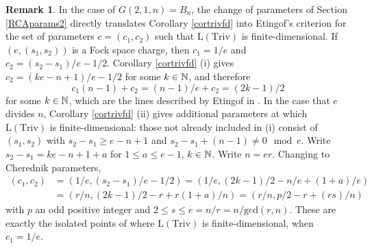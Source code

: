 \documentclass[12pt]{amsart}
\numberwithin{equation}{section}
\theoremstyle{definition}
\newtheorem{remark}[equation]{Remark}
\newcommand{\el}{\mathrm{L}}
\newcommand{\triv}{\mathrm{Triv}}
\begin{document}
\begin{remark}
In the case of $G(2,1,n)=B_n$, the change of parameters of Section \ref{RCAparams2} directly translates Corollary \ref{cortrivfd} into Etingof's criterion \cite[Section 4.2]{Etingof2012} for the set of parameters $c=(c_1,c_2)$ such that $\el(\triv)$ is finite-dimensional. If $(e,(s_1,s_2))$ is a Fock space charge, then $c_1=1/e$ and $c_2=(s_2-s_1)/e-1/2$. Corollary \ref{cortrivfd} (i) gives $c_2=(ke-n+1)/e-1/2$ for some $k\in\mathbb{N}$, and therefore $$c_1(n-1)+c_2=(n-1)/e+c_2=(2k-1)/2$$ for some $k\in\mathbb{N}$, which are the lines described by Etingof in \cite[Section 4.2]{Etingof2012}. In the case that $e$ divides $n$, Corollary \ref{cortrivfd} (ii) gives additional parameters at which $\el(\triv)$ is finite-dimensional: those not already included in (i) consist of $(s_1,s_2)$ with $s_2-s_1\geq e-n+1$ and $s_2-s_1+(n-1)\neq 0 \mod e$. Write $s_2-s_1=ke-n+1+a$ for $1\leq a\leq e-1$, $k\in\mathbb{N}$. Write $n=er$. Changing to Cherednik parameters, 
\begin{align*}(c_1,c_2)&=(1/e,(s_2-s_1)/e-1/2)=(1/e,(2k-1)/2-n/e+(1+a)/e)\\&=(r/n,(2k-1)/2-r+r(1+a)/n)=(r/n,p/2-r+(rs)/n)
\end{align*}
with $p$ an odd positive integer and $2\leq s\leq e=n/r=n/\mathrm{gcd}(r,n)$. These are exactly the isolated points of \cite[Section 4.2]{Etingof2012} where $\el(\triv)$ is finite-dimensional, when $c_1=1/e$.


\end{remark}
\end{document}
